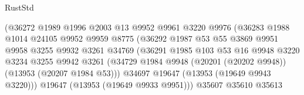 \begin{lexlean}{RustStd}
\begin{coremodule}
                                      (@36272
                                        @1989
                                        @1996
                                        @2003
                                        @13
                                        @9952
                                        @9961
                                        @3220
                                        @9976
                                        (@36283
                                          @1988
                                          @1014
                                          @24105
                                          @9952
                                          @9959
                                          @8775
                                          (@36292
                                            @1987
                                            @53
                                            @55
                                            @3869
                                            @9951
                                            @9958
                                            @3255
                                            @9932
                                            @3261
                                            @34769
                                            (@36291
                                              @1985
                                              @103
                                              @53
                                              @16
                                              @9948
                                              @3220
                                              @3234
                                              @3255
                                              @9942
                                              @3261
                                              (@34729
                                                @1984
                                                @9948
                                                (@20201 (@20202 @9948))
                                                (@13953 (@20207 @1984 @53)))
                                              @34697
                                              @19647
                                              (@13953 (@19649 @9943 @3220)))
                                            @19647
                                            (@13953 (@19649 @9933 @9951)))
                                          @35607
                                          @35610
                                          @35613

\end{coremodule}
\end{lexlean}
